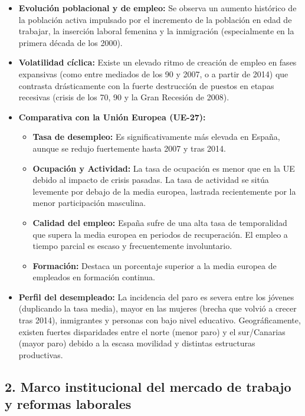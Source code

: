 \begin{itemize}
  \item \textbf{Evolución poblacional y de empleo:} Se observa un aumento histórico de la población activa impulsado por el incremento de la población en edad de trabajar, la inserción laboral femenina y la inmigración (especialmente en la primera década de los 2000).

  \item \textbf{Volatilidad cíclica:} Existe un elevado ritmo de creación de empleo en fases expansivas (como entre mediados de los 90 y 2007, o a partir de 2014) que contrasta drásticamente con la fuerte destrucción de puestos en etapas recesivas (crisis de los 70, 90 y la Gran Recesión de 2008).

  \item \textbf{Comparativa con la Unión Europea (UE-27):}
    \begin{itemize}
      \item \textbf{Tasa de desempleo:} Es significativamente más elevada en España, aunque se redujo fuertemente hasta 2007 y tras 2014.
      \item \textbf{Ocupación y Actividad:} La tasa de ocupación es menor que en la UE debido al impacto de crisis pasadas. La tasa de actividad se sitúa levemente por debajo de la media europea, lastrada recientemente por la menor participación masculina.
      \item \textbf{Calidad del empleo:} España sufre de una alta tasa de temporalidad que supera la media europea en periodos de recuperación. El empleo a tiempo parcial es escaso y frecuentemente involuntario.
      \item \textbf{Formación:} Destaca un porcentaje superior a la media europea de empleados en formación continua.
    \end{itemize}

  \item \textbf{Perfil del desempleado:} La incidencia del paro es severa entre los jóvenes (duplicando la tasa media), mayor en las mujeres (brecha que volvió a crecer tras 2014), inmigrantes y personas con bajo nivel educativo. Geográficamente, existen fuertes disparidades entre el norte (menor paro) y el sur/Canarias (mayor paro) debido a la escasa movilidad y distintas estructuras productivas.
\end{itemize}

\subsection*{2. Marco institucional del mercado de trabajo y reformas laborales}

